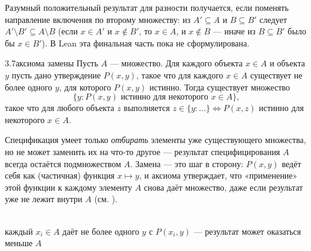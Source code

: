 \begin{remark}
Разумный положительный результат для разности получается, если поменять направление
включения по второму множеству: из $A' \subseteq A$ и $B \subseteq B'$ следует
$A' \setminus B' \subseteq A \setminus B$ (если $x \in A'$ и $x \notin B'$, то $x \in A$, и
$x \notin B$ — иначе из $B \subseteq B'$ было бы $x \in B'$). В Lean эта финальная часть
 пока не сформулирована.
\end{remark}

\begin{axiom}{3.7}{аксиома замены}
Пусть $A$ — множество. Для каждого объекта $x \in A$ и объекта $y$ пусть дано утверждение
$P(x,y)$, такое что для каждого $x \in A$ существует не более одного $y$, для которого
$P(x,y)$ истинно. Тогда существует множество
\[
  \{y : P(x,y)\text{ истинно для некоторого }x \in A\},
\]
такое что для любого объекта $z$ выполняется $z \in \{y : \ldots\} \iff P(x,z)$ истинно
для некоторого $x \in A$.
\end{axiom}

\begin{intuition}
Спецификация умеет только \emph{отбирать} элементы уже существующего множества, но не может
заменить их на что-то другое — результат специфицирования $A$ всегда остаётся подмножеством
$A$. Замена — это шаг в сторону: $P(x,y)$ ведёт себя как (частичная) функция $x \mapsto y$, и
аксиома утверждает, что «применение» этой функции к каждому элементу $A$ снова даёт
множество, даже если результат уже не лежит внутри $A$
(см. ).

\begin{center}
\\
{\footnotesize\color{intuitiongray}каждый $x_i\in A$ даёт не более одного $y$ с $P(x_i,y)$
— результат может оказаться меньше $A$}
\end{center}
\end{intuition}

